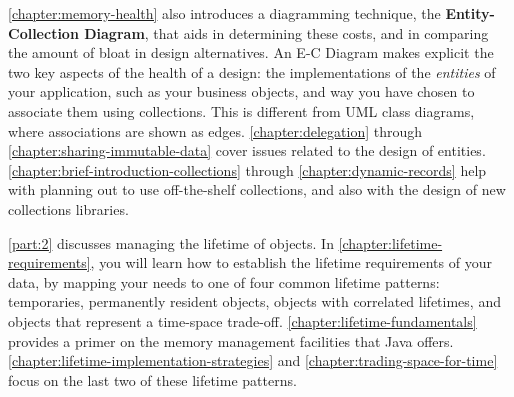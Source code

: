 \autoref{chapter:memory-health} also introduces a diagramming technique, the
\textbf{Entity-Collection Diagram}, that aids in determining these costs, and in
comparing the amount of bloat in design alternatives.
An E-C Diagram makes explicit the two key aspects of the health of a design:
the implementations of the \emph{entities} of your application, such as your
business objects, and way you have chosen to associate them using collections.
This is different from UML class diagrams, where associations are shown as
edges.
\autoref{chapter:delegation} through
\autoref{chapter:sharing-immutable-data} cover issues related to the design of
entities.
\autoref{chapter:brief-introduction-collections} through
\autoref{chapter:dynamic-records} help with planning out to use off-the-shelf
collections, and also with the design of new collections libraries.


\begin{comment}
[NMM 20120628 too much E-C diagram detail for intro?]
A data model implementation begins with a conceptual understanding of the
entities and relationships in the model.  This may be an informal understanding,
or it may be formalized in a diagram such as an E-R diagram or a UML class
diagram.  At some point that conceptual model is turned into Java classes that
represent the entities, attributes, and assocations of the model, as well as any
auxiliary structures, such as indexes, needed to access the data.  The example
below shows a simple conceptual model, using a UML class diagram.  A Java
implementation of that model is also shown, using rectangles for classes and
arrows for references.  %
in that it shows
\end{comment}


\autoref{part:2} discusses managing the lifetime of objects. In
\autoref{chapter:lifetime-requirements}, you will learn how to establish the
lifetime requirements of your data, by mapping your needs to one of four common
lifetime patterns: temporaries, permanently resident objects, objects with
correlated lifetimes, and objects that represent a time-space trade-off.
\autoref{chapter:lifetime-fundamentals} provides a primer on the memory
management facilities that Java offers.
\autoref{chapter:lifetime-implementation-strategies} and
\autoref{chapter:trading-space-for-time} focus on the last two of these lifetime
patterns.

